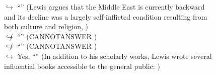 \documentclass[11pt,a4paper, onecolumn]{article}
\begin{document}
\begin{figure}[t] \small \begin{tcolorbox}[boxsep=0pt,left=5pt,right=0pt,top=2pt,colback = yellow!5] \begin{dialogue}
 \small 
\colorbox{pink!25}{$\hookrightarrow$}
{ ``'' (Lewis argues that the Middle East is currently backward and its decline was a largely self-inflicted condition resulting from both culture and religion, ) }
\\
\colorbox{pink!25}{$\not\hookrightarrow$}
{ ``'' (CANNOTANSWER ) }
\\
\colorbox{pink!25}{$\not\hookrightarrow$}
{ ``'' (CANNOTANSWER ) }
\\
\colorbox{pink!25}{$\hookrightarrow$}
\colorbox{red!25}{Yes,}
{ ``'' (In addition to his scholarly works, Lewis wrote several influential books accessible to the general public: ) }
\\
 \end{dialogue}\end{tcolorbox}\end{figure}
\end{document}
